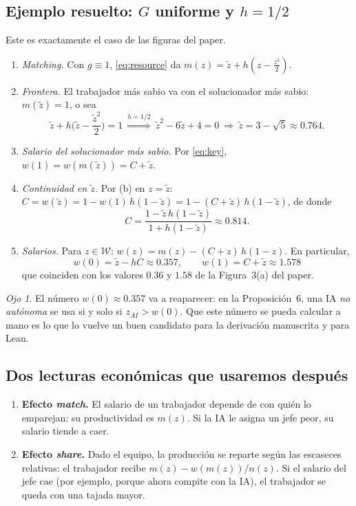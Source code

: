 \documentclass[11pt]{article}
\theoremstyle{definition}
\theoremstyle{remark}
\newtheorem*{ojo}{Ojo}
\newcommand{\zai}{z_{AI}}
\newcommand{\zt}{\tilde z}
\newcommand{\W}{\mathcal W}
\begin{document}
\subsection{Ejemplo resuelto: \texorpdfstring{$G$ uniforme y $h=1/2$}{G uniforme y h=1/2}}

Este es exactamente el caso de las figuras del paper.

\begin{enumerate}[label=\textbf{Paso \arabic*.}, leftmargin=*]
  \item \emph{Matching.} Con $g\equiv1$, \eqref{eq:resource} da $m(z)=\zt+h\left(z-\tfrac{z^2}{2}\right)$.
  \item \emph{Frontera.} El trabajador más sabio va con el solucionador más sabio: $m(\zt)=1$, o sea
  \[
    \zt+h\Big(\zt-\frac{\zt^{2}}{2}\Big)=1 \ \stackrel{h=1/2}{\Longrightarrow}\ \zt^{2}-6\zt+4=0\ \Longrightarrow\ \zt=3-\sqrt5\approx0.764 .
  \]
  \item \emph{Salario del solucionador más sabio.} Por \eqref{eq:key}, $w(1)=w(m(\zt))=C+\zt$.
  \item \emph{Continuidad en $\zt$.} Por (b) en $z=\zt$: $C=w(\zt)=1-w(1)\,h(1-\zt)=1-(C+\zt)\,h(1-\zt)$, de donde
  \[
    C=\frac{1-\zt\,h(1-\zt)}{1+h(1-\zt)}\approx0.814 .
  \]
  \item \emph{Salarios.} Para $z\in\W$: $w(z)=m(z)-(C+z)\,h(1-z)$. En particular,
  \[
    \boxed{\,w(0)=\zt-hC\approx0.357,\qquad w(1)=C+\zt\approx1.578\,}
  \]
  que coinciden con los valores $0.36$ y $1.58$ de la Figura~3(a) del paper.
\end{enumerate}

\begin{ojo}
El número $w(0)\approx0.357$ va a reaparecer: en la Proposición~6, una IA \emph{no autónoma} se usa si y solo si $\zai>w(0)$. Que este número se pueda calcular a mano es lo que lo vuelve un buen candidato para la derivación manuscrita y para Lean.
\end{ojo}

\subsection{Dos lecturas económicas que usaremos después}

\begin{enumerate}
  \item \textbf{Efecto \emph{match}.} El salario de un trabajador depende de con quién lo emparejan: su productividad es $m(z)$. Si la IA le asigna un jefe peor, su salario tiende a caer.
  \item \textbf{Efecto \emph{share}.} Dado el equipo, la producción se reparte según las escaseces relativas: el trabajador recibe $m(z)-w(m(z))/n(z)$. Si el salario del jefe cae (por ejemplo, porque ahora compite con la IA), el trabajador se queda con una tajada mayor.
\end{enumerate}
\end{document}
